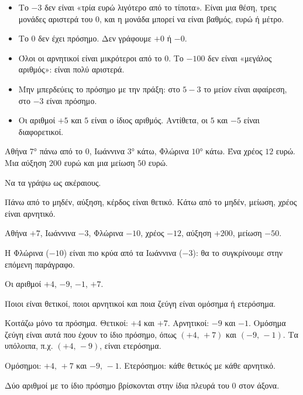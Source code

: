 \begin{prosoxi}
\begin{itemize}[leftmargin=1.2em,itemsep=0.3ex,topsep=2pt]
\item Το $-3$ δεν είναι «τρία ευρώ λιγότερο από το τίποτα». Είναι μια θέση, τρεις μονάδες αριστερά του $0$, και η μονάδα μπορεί να είναι βαθμός, ευρώ ή μέτρο.
\item Το $0$ δεν έχει πρόσημο. Δεν γράφουμε $+0$ ή $-0$.
\item Όλοι οι αρνητικοί είναι μικρότεροι από το $0$. Το $-100$ δεν είναι «μεγάλος αριθμός»: είναι πολύ αριστερά.
\item Μην μπερδεύεις το πρόσημο με την πράξη: στο $5-3$ το μείον είναι αφαίρεση, στο $-3$ είναι πρόσημο.
\item Οι αριθμοί $+5$ και $5$ είναι ο ίδιος αριθμός. Αντίθετα, οι $5$ και $-5$ είναι διαφορετικοί.
\end{itemize}
\end{prosoxi}


\tixero Αθήνα $7$° πάνω από το $0$, Ιωάννινα $3$° κάτω, Φλώρινα $10$° κάτω. Ένα χρέος $12$ ευρώ. Μια αύξηση $200$ ευρώ και μια μείωση $50$ ευρώ.\par
\tithelo Να τα γράψω ως ακέραιους.\par
\possindeo Πάνω από το μηδέν, αύξηση, κέρδος είναι θετικό. Κάτω από το μηδέν, μείωση, χρέος είναι αρνητικό.\par
\apantisi Αθήνα $+7$, Ιωάννινα $-3$, Φλώρινα $-10$, χρέος $-12$, αύξηση $+200$, μείωση $-50$.\par
\elegxos Η Φλώρινα ($-10$) είναι πιο κρύα από τα Ιωάννινα ($-3$): θα το συγκρίνουμε στην επόμενη παράγραφο.

\tixero Οι αριθμοί $+4$, $-9$, $-1$, $+7$.\par
\tithelo Ποιοι είναι θετικοί, ποιοι αρνητικοί και ποια ζεύγη είναι ομόσημα ή ετερόσημα.\par
\possindeo Κοιτάζω μόνο τα πρόσημα. Θετικοί: $+4$ και $+7$. Αρνητικοί: $-9$ και $-1$. Ομόσημα ζεύγη είναι αυτά που έχουν το ίδιο πρόσημο, όπως $(+4,\,+7)$ και $(-9,\,-1)$. Τα υπόλοιπα, π.χ. $(+4,\,-9)$, είναι ετερόσημα.\par
\apantisi Ομόσημοι: $+4,\,+7$ και $-9,\,-1$. Ετερόσημοι: κάθε θετικός με κάθε αρνητικό.\par
\elegxos Δύο αριθμοί με το ίδιο πρόσημο βρίσκονται στην ίδια πλευρά του $0$ στον άξονα.

